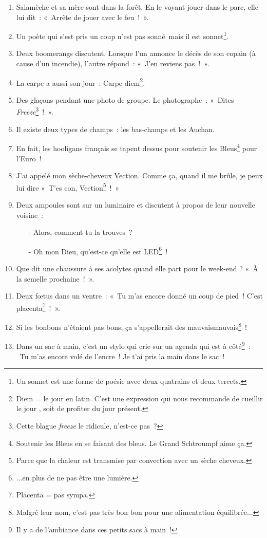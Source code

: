 \documentclass[10pt,a5paper,fullpage]{book}
\begin{document}
\begin{enumerate}
		\item Salamèche et sa mère sont dans la forêt. En le voyant jouer dans le parc, elle lui dit~: «~Arrête de jouer avec le feu~!~».			
		\item Un poète qui s'est pris un coup n'est pas sonné mais il est sonnet\footnote{Un sonnet est une forme de poésie avec deux quatrains et deux tercets.}.
		\item Deux boomerangs discutent. Lorsque l’un annonce le décès de son copain (à cause d’un incendie), l’autre répond~: «~J’en reviens pas~!~».
		\item La carpe a aussi son jour~: Carpe diem\footnote{Diem = le jour en latin. C'est une expression qui nous recommande de \guillemotleft cueillir le jour \guillemotright, soit de profiter du jour présent.}.
		\item Des glaçons pendant une photo de groupe. Le photographe~: « Dites \textit{Freeze}\footnote{Cette blague \textit{freeze} le ridicule, n'est-ce pas~?}~! ».
		\item Il existe deux types de champs~: les bas-champs et les Auchan.
		\item En fait, les hooligans français se tapent dessus pour soutenir les Bleus\footnote{Soutenir les Bleus en se faisant des bleus. Le Grand Schtroumpf aime ça.} pour l’Euro~!
		\item J’ai appelé mon sèche-cheveux Vection. Comme ça, quand il me brûle, je peux lui dire « T’es con, Vection\footnote{Parce que la chaleur est transmise par convection avec un sèche cheveux.}~! »
		\item Deux ampoules sont sur un luminaire et discutent à propos de leur nouvelle voisine~:
		\begin{itemize}
			\item[-] Alors, comment tu la trouves~?
			\item[-] Oh mon Dieu, qu’est-ce qu’elle est LED\footnote{...en plus de ne pas être une lumière.}~!
		\end{itemize}
		\item Que dit une chaussure à ses acolytes quand elle part pour le week-end ? «~À la semelle prochaine~!~».		
		\item Deux fœtus dans un ventre~: « Tu m’as encore donné un coup de pied~! C’est placenta\footnote{Placenta = pas sympa.}~!~».
		\item Si les bonbons n'étaient pas bons, ça s'appellerait des mauvaismauvais\footnote{Malgré leur nom, c'est pas très bon bon pour une alimentation équilibrée...}~! 
		\item Dans un sac à main, c'est un stylo qui crie sur un agenda qui est à côté\footnote{Il y a de l'ambiance dans ces petits sacs à main~!}~: \guillemotleft~Tu m’as encore volé de l’encre~! Je t’ai pris la main dans le sac~!~\guillemotright

\end{enumerate}
\end{document}
